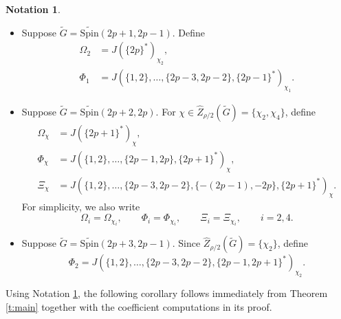 \documentclass{amsart}
\newcommand{\Spin}{{\mathrm{Spin}}}
\theoremstyle{definition}
\newtheorem{notation}[thm]{Notation}
\begin{document}
\begin{notation}\label{n:small}

\begin{itemize}
    \item[(a)] Suppose
    \(\widetilde G=\widetilde{\Spin}(2p+1,2p-1)\).
    Define
    \begin{align*}
    \Omega_2
    &=
    J(\{2p\}^*)_{\chi_2},\\
    \Phi_1
    &=
    J(\{1,2\},\ldots,\{2p-3,2p-2\},
      \{2p-1\}^*)_{\chi_1}.
    \end{align*}

    \item[(b)] Suppose
    \(\widetilde G=\widetilde{\Spin}(2p+2,2p)\).
    For
    \(\chi\in\widehat Z_{\rho/2}(\widetilde G) =\{\chi_2,\chi_4\}\), define
    \begin{align*}
        \Omega_\chi
        &=
        J(\{2p+1\}^*)_\chi,\\
        \Phi_\chi
        &=
        J(\{1,2\},\ldots,\{2p-1,2p\},
          \{2p+1\}^*)_\chi,\\
        \Xi_\chi
        &=
        J(\{1,2\},\ldots,\{2p-3,2p-2\},
          \{-(2p-1),-2p\},\{2p+1\}^*)_\chi.
    \end{align*}
  For simplicity, 
    we also write
    \[
    \Omega_i=\Omega_{\chi_i},
    \qquad
    \Phi_i=\Phi_{\chi_i},
    \qquad
    \Xi_i=\Xi_{\chi_i},
    \qquad i=2,4.
    \]

    \item[(c)] Suppose
    \(\widetilde G=\widetilde{\Spin}(2p+3,2p-1)\).
    Since
    \(\widehat Z_{\rho/2}(\widetilde G)=\{\chi_2\}\), define
    \[
    \Phi_2
    =
    J(\{1,2\},\ldots,\{2p-3,2p-2\},
      \{2p-1,2p+1\}^*)_{\chi_2}.
    \]
\end{itemize}

\end{notation}







Using Notation \ref{n:small}, the following corollary follows immediately from Theorem \ref{t:main} together
with the coefficient computations in its proof.
\end{document}
